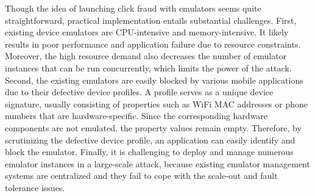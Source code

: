 \documentclass[conference]{IEEEtranl}
\begin{document}
	Though the idea of launching click fraud with emulators seems quite straightforward, practical implementation entails substantial challenges. 
	First, existing device emulators are CPU-intensive and memory-intensive. It likely results in poor performance and application failure due to resource constraints. Moreover, the high resource demand also decreases the number of emulator instances that can be run concurrently, which limits the power of the attack. %
	Second, the existing emulators are easily blocked by various mobile applications due to their defective device profiles. A profile serves as a unique device signature, usually consisting of properties such as WiFi MAC addresses or phone numbers that are hardware-specific. Since the corresponding hardware components are not emulated, the property values remain empty. Therefore, by scrutinizing the defective device profile, an application can easily identify and block the emulator.
	Finally, it is challenging to deploy and manage numerous emulator instances in a large-scale attack, because existing emulator management systems are centralized and they fail to cope with the scale-out and fault tolerance issues. 

	 

\end{document}
